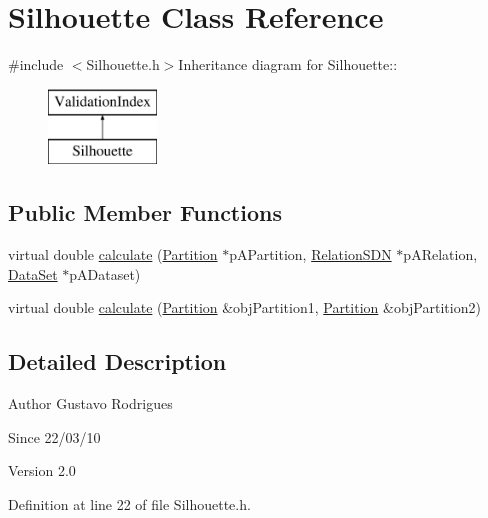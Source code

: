 \hypertarget{classSilhouette}{
\section{Silhouette Class Reference}
\label{classSilhouette}
}


{\ttfamily \#include $<$Silhouette.h$>$}Inheritance diagram for Silhouette::\begin{figure}[H]
\begin{center}
\leavevmode
\includegraphics[height=2cm]{classSilhouette}
\end{center}
\end{figure}
\subsection*{Public Member Functions}
\begin{DoxyCompactItemize}
\item 
virtual double \hyperlink{classSilhouette_af8817c1accb7b60814cfff988c9ccc05}{calculate} (\hyperlink{classPartition}{Partition} $\ast$pAPartition, \hyperlink{classRelationSDN}{RelationSDN} $\ast$pARelation, \hyperlink{classDataSet}{DataSet} $\ast$pADataset)
\item 
virtual double \hyperlink{classSilhouette_aaf47b647b2409999209c58316ab8e980}{calculate} (\hyperlink{classPartition}{Partition} \&objPartition1, \hyperlink{classPartition}{Partition} \&objPartition2)
\end{DoxyCompactItemize}


\subsection{Detailed Description}
\begin{DoxyAuthor}{Author}
Gustavo Rodrigues 
\end{DoxyAuthor}
\begin{DoxySince}{Since}
22/03/10 
\end{DoxySince}
\begin{DoxyVersion}{Version}
2.0 
\end{DoxyVersion}


Definition at line 22 of file Silhouette.h.

